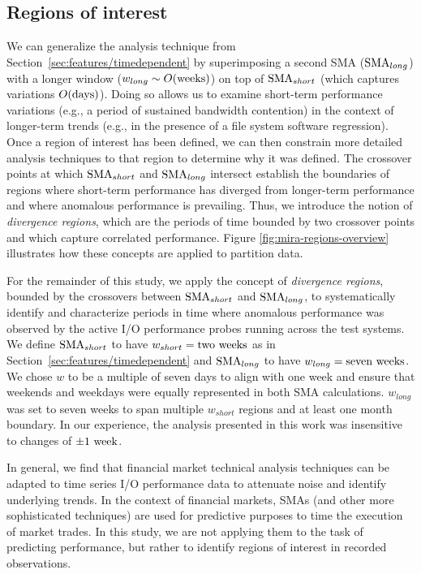 \subsection{Regions of interest} \label{sec:features/partitioning}

We can generalize the analysis technique from
Section~\ref{sec:features/timedependent} 
by superimposing a second SMA ($\textup{SMA}_{long}$) with a longer window (${w_{long} \sim O(\textup{weeks})}$) on top of $\textup{SMA}_{short}$ (which captures variations ${O(\textup{days})}$).
Doing so allows us to examine short-term performance variations (e.g., a
period of sustained bandwidth contention) in the context of longer-term
trends (e.g., in the presence of a file system software regression).
Once a region of interest has been defined, we can then constrain more detailed
analysis techniques to that region to determine why it was defined.
The crossover points at which $\textup{SMA}_{short}$ and  $\textup{SMA}_{long}$ intersect establish the boundaries of regions where short-term performance has diverged from longer-term performance and where anomalous performance is prevailing.
Thus, we introduce the notion of \emph{divergence regions}, which are the periods of time bounded by two crossover points and which capture correlated performance.
Figure \ref{fig:mira-regions-overview} illustrates how these concepts are applied to partition data.

For the remainder of this study, we apply the concept of \emph{divergence regions}, bounded by the crossovers between $\textup{SMA}_{short}$ and $\textup{SMA}_{long}$, to systematically identify and characterize periods in time where anomalous performance was observed by the active I/O performance probes running across the test systems.
We define $\textup{SMA}_{short}$ to have ${w_{short} = \textup{two weeks}}$ as in Section~\ref{sec:features/timedependent} and $\textup{SMA}_{long}$ to have ${w_{long} = \textup{seven weeks}}$.
We chose $w$  to be a multiple of seven days to align with one
week and ensure that weekends and weekdays were equally represented in both SMA
calculations. $w_{long}$ was set to seven weeks to span multiple $w_{short}$
regions and at least one month boundary.  In our experience, the analysis
presented in this work was insensitive to changes of $\pm 1 \textup{ week}$.

In general, we find that financial market technical
analysis techniques can be adapted to
time series I/O performance data to attenuate noise and identify underlying trends.
In the context of financial markets, SMAs (and other more
sophisticated techniques) are used for predictive purposes to time
the execution of market trades.  In this study, we are not applying them to
the task of predicting performance, but rather to identify regions of
interest in recorded observations.

